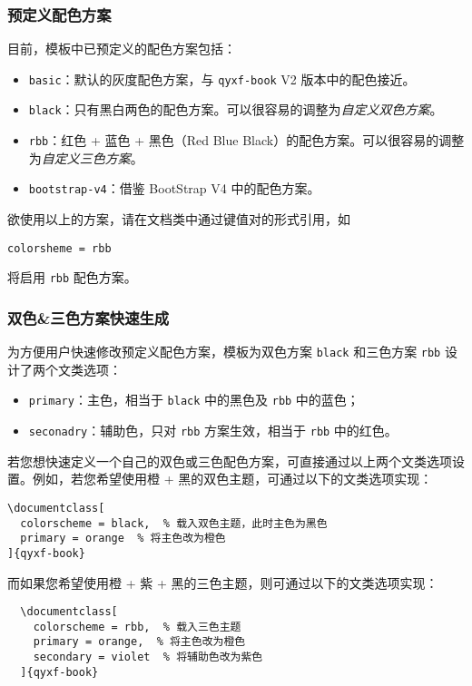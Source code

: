 \documentclass[
  10pt,
  twoside,
  openany,
  b5paper, %
  colorscheme = basic, %
]{qyxf-book}
\begin{document}
\subsubsection{预定义配色方案}

目前，模板中已预定义的配色方案包括：
\begin{itemize}
  \item \verb|basic|：默认的灰度配色方案，与 \verb|qyxf-book| V2 版本中的配色接近。
  \item \verb|black|：只有黑白两色的配色方案。可以很容易的调整为\emph{自定义双色方案}。
  \item \verb|rbb|：红色 + 蓝色 + 黑色（Red Blue Black）的配色方案。可以很容易的调整为\emph{自定义三色方案}。
  \item \verb|bootstrap-v4|：借鉴 BootStrap V4 中的配色方案。
\end{itemize}
欲使用以上的方案，请在文档类中通过键值对的形式引用，如
\begin{tcolorbox}
\verb|colorsheme = rbb| 
\end{tcolorbox}
将启用 \verb|rbb| 配色方案。

\subsubsection{双色\&三色方案快速生成}
为方便用户快速修改预定义配色方案，模板为双色方案 \verb|black| 和三色方案 \verb|rbb| 设计了两个文类选项：
\begin{itemize}
  \item \verb|primary|：主色，相当于 \verb|black| 中的黑色及 \verb|rbb| 中的蓝色；
  \item \verb|seconadry|：辅助色，只对 \verb|rbb| 方案生效，相当于 \verb|rbb| 中的红色。
\end{itemize}
若您想快速定义一个自己的双色或三色配色方案，可直接通过以上两个文类选项设置。例如，若您希望使用橙 + 黑的双色主题，可通过以下的文类选项实现：
\begin{tcolorbox}
\begin{verbatim}
\documentclass[
  colorscheme = black,  % 载入双色主题，此时主色为黑色
  primary = orange  % 将主色改为橙色
]{qyxf-book}
\end{verbatim}
\end{tcolorbox}
而如果您希望使用橙 + 紫 + 黑的三色主题，则可通过以下的文类选项实现：
\begin{tcolorbox}
\begin{verbatim}
  \documentclass[
    colorscheme = rbb,  % 载入三色主题
    primary = orange,  % 将主色改为橙色
    secondary = violet  % 将辅助色改为紫色
  ]{qyxf-book}
\end{verbatim}
\end{tcolorbox}
\end{document}
